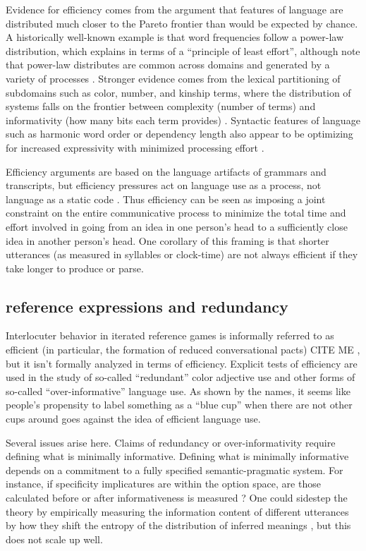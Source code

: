 \documentclass[]{article}
\begin{document}
Evidence for efficiency comes from the argument that features of language are distributed much closer to the Pareto frontier than would be expected by chance. A historically well-known example is that word frequencies follow a power-law distribution, which \cite{zipf1949} explains in terms of a ``principle of least effort'', although note that power-law distributes are common across domains and generated by a variety of processes \cite{piantadosi2014}. Stronger evidence comes from the lexical partitioning of subdomains such as color, number, and kinship terms, where the distribution of systems falls on the frontier between complexity (number of terms) and informativity (how many bits each term provides) \cite{keysar2000, gibson2019}. Syntactic features of language such as harmonic word order or dependency length also appear to be optimizing for increased expressivity with minimized processing effort \cite{gibson2019, hawkins1995}. 
	
Efficiency arguments are based on the language artifacts of grammars and transcripts, but efficiency pressures act on language use as a process, not language as a static code \cite{gibson2019}. Thus efficiency can be seen as imposing a joint constraint on the entire communicative process to minimize the total time and effort involved in going from an idea in one person's head to a sufficiently close idea in another person's head. One corollary of this framing is that shorter utterances (as measured in syllables or clock-time) are not always efficient if they take longer to produce or parse. 

\subsection{reference expressions and redundancy}
Interlocuter behavior in iterated reference games is informally referred to as efficient (in particular, the formation of reduced conversational pacts) CITE ME , but it isn't formally analyzed in terms of efficiency. Explicit tests of efficiency are used in the study of so-called  ``redundant'' color adjective use and other forms of so-called ``over-informative'' language use. As shown by the names, it seems like people's propensity to label something as a ``blue cup'' when there are not other cups around goes against the idea of efficient language use. 

Several issues arise here. Claims of redundancy or over-informativity require defining what is minimally informative. Defining what is minimally informative depends on a commitment to a fully specified semantic-pragmatic system. For instance, if specificity implicatures are within the option space, are those calculated before or after informativeness is measured \cite{bergen}? One could sidestep the theory by empirically measuring the information content of different utterances by how they shift the entropy of the distribution of inferred meanings \cite{degen20200406}, but this does not scale up well. 
\end{document}
